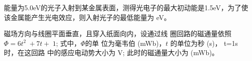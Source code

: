 \documentclass{njustexam}
\begin{document}


\begin{problem}
能量为5.0eV的光子入射到某金属表面，测得光电子的最大初动能是1.5eV，为了使该金属能产生光电效应，则入射光子的最低能量为 eV。                                              
\end{problem}



\begin{problem}
  磁场方向与线圈平面垂直，且穿入纸面向内，设通过线
  圈回路的磁通量依照$\Phi = 6t^2 + 7t + 1$; 式中，$\Phi$的单
位为毫韦伯 (mWb)，$t$ 的单位为秒 (s)，
t=1s 时，在这回路
中的感应电动势大小为 V; 此时的磁通量大小为 (mWb)。
\end{problem}




\end{document}
